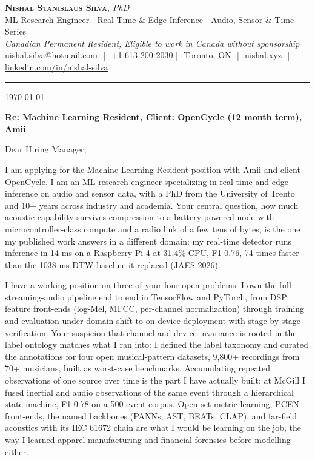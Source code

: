 \documentclass[11pt]{article}
\makeatletter
\newcommand{\clName}{Nishal Stanislaus Silva}
\newcommand{\clEmail}{nishal.silva@hotmail.com}
\newcommand{\clPhone}{+1 613 200 2030}
\newcommand{\clCity}{Toronto, ON}
\newcommand{\clSite}{https://nishal.xyz}
\newcommand{\clLinkedIn}{https://www.linkedin.com/in/nishal-silva}
\newcommand{\clStatus}{Canadian Permanent Resident, Eligible to work in Canada without sponsorship}
\newcommand{\clTagline}{ML Research Engineer | Real-Time \& Edge Inference | Audio, Sensor \& Time-Series}
\newcommand{\clRole}{Machine Learning Resident, Client: OpenCycle (12 month term)}
\newcommand{\clCompany}{Amii}
\newcommand{\clAddressee}{Dear Hiring Manager,}
\makeatother
\begin{document}
\pagestyle{empty}
\begin{center}
    {\LARGE \scshape \textbf{\clName}}{\large \textit{, PhD}}\\[1pt]
    {\small \clTagline}\\[1pt]
    {\footnotesize\textit{\clStatus}}\\[1pt]
    {\small
    \href{mailto:\clEmail}{\clEmail} \,\,|\,\, \clPhone \,\,|\,\, \clCity
    \,\,|\,\, \href{\clSite}{nishal.xyz} \,\,|\,\, \href{\clLinkedIn}{linkedin.com/in/nishal-silva}}
\end{center}

\rule{\linewidth}{0.4pt}\vspace{0.6em}

\today

\textbf{Re: \clRole{}, \clCompany{}}

\clAddressee

I am applying for the Machine Learning Resident position with Amii and client OpenCycle. I am an ML research engineer specializing in real-time and edge inference on audio and sensor data, with a PhD from the University of Trento and 10+ years across industry and academia. Your central question, how much acoustic capability survives compression to a battery-powered node with microcontroller-class compute and a radio link of a few tens of bytes, is the one my published work answers in a different domain: my real-time detector runs inference in 14 ms on a Raspberry Pi 4 at 31.4\% CPU, F1 0.76, 74 times faster than the 1038 ms DTW baseline it replaced (JAES 2026).

I have a working position on three of your four open problems. I own the full streaming-audio pipeline end to end in TensorFlow and PyTorch, from DSP feature front-ends (log-Mel, MFCC, per-channel normalization) through training and evaluation under domain shift to on-device deployment with stage-by-stage verification. Your suspicion that channel and device invariance is rooted in the label ontology matches what I ran into: I defined the label taxonomy and curated the annotations for four open musical-pattern datasets, 9,800+ recordings from 70+ musicians, built as worst-case benchmarks. Accumulating repeated observations of one source over time is the part I have actually built: at McGill I fused inertial and audio observations of the same event through a hierarchical state machine, F1 0.78 on a 500-event corpus. Open-set metric learning, PCEN front-ends, the named backbones (PANNs, AST, BEATs, CLAP), and far-field acoustics with its IEC 61672 chain are what I would be learning on the job, the way I learned apparel manufacturing and financial forensics before modelling either.
\end{document}
